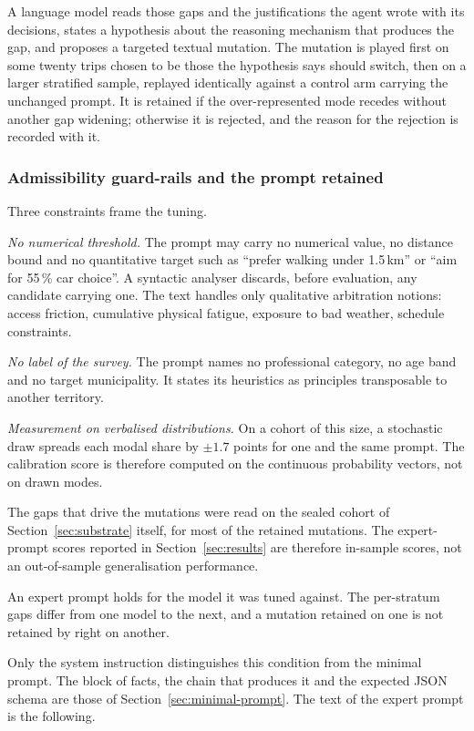A language model reads those gaps and the justifications the agent wrote with its decisions, states a hypothesis about the reasoning mechanism that produces the gap, and proposes a targeted textual mutation. The mutation is played first on some twenty trips chosen to be those the hypothesis says should switch, then on a larger stratified sample, replayed identically against a control arm carrying the unchanged prompt. It is retained if the over-represented mode recedes without another gap widening; otherwise it is rejected, and the reason for the rejection is recorded with it.

\subsubsection{Admissibility guard-rails and the prompt retained}

Three constraints frame the tuning.

\textit{No numerical threshold.} The prompt may carry no numerical value, no distance bound and no quantitative target such as ``prefer walking under 1.5\,km'' or ``aim for 55\,\% car choice''. A syntactic analyser discards, before evaluation, any candidate carrying one. The text handles only qualitative arbitration notions: access friction, cumulative physical fatigue, exposure to bad weather, schedule constraints.

\textit{No label of the survey.} The prompt names no professional category, no age band and no target municipality. It states its heuristics as principles transposable to another territory.

\textit{Measurement on verbalised distributions.} On a cohort of this size, a stochastic draw spreads each modal share by $\pm 1.7$ points for one and the same prompt. The calibration score is therefore computed on the continuous probability vectors, not on drawn modes.

The gaps that drive the mutations were read on the sealed cohort of Section~\ref{sec:substrate} itself, for most of the retained mutations. The expert-prompt scores reported in Section~\ref{sec:results} are therefore in-sample scores, not an out-of-sample generalisation performance.

An expert prompt holds for the model it was tuned against. The per-stratum gaps differ from one model to the next, and a mutation retained on one is not retained by right on another.

Only the system instruction distinguishes this condition from the minimal prompt. The block of facts, the chain that produces it and the expected JSON schema are those of Section~\ref{sec:minimal-prompt}. The text of the expert prompt is the following.

